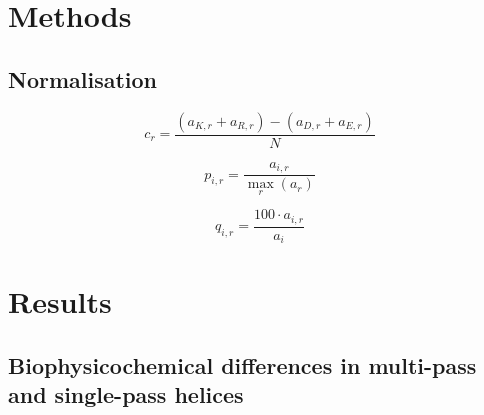 \section{Methods}

\subsection{Normalisation}

\begin{equation}
c_r=\frac{(a_{K,r}+a_{R,r})-(a_{D,r}+a_{E,r})}{N}
\end{equation}


\begin{equation}
p_{i,r}=\frac{a_{i,r}}{\underset{r}{\max}{(a_r)}}
\end{equation}

\begin{equation}
q_{i,r}=\frac{100·a_{i,r}}{a_i}
\end{equation}

\section{Results}
\subsection{Biophysicochemical differences in multi-pass and single-pass helices}
